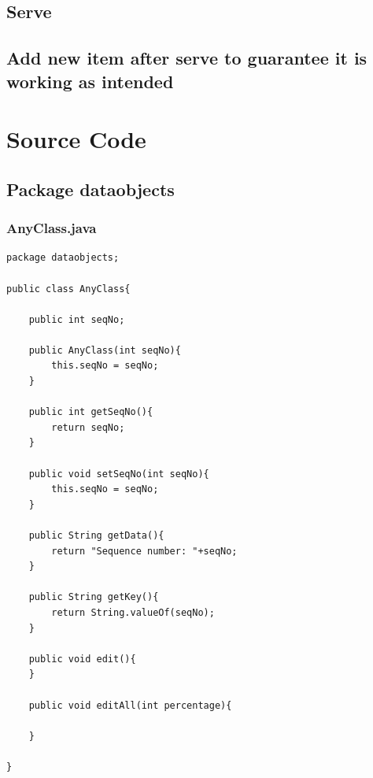 \documentclass[12pt]{article}
\begin{document}
\subsection{Serve}
\subsection{Add new item after serve to guarantee it is working as intended}
\bigskip
\newpage
\section{Source Code}
\bigskip

\footnotesize
\subsection{Package dataobjects}
\subsubsection{AnyClass.java}
\begin{lstlisting}
package dataobjects;

public class AnyClass{

    public int seqNo;

    public AnyClass(int seqNo){
        this.seqNo = seqNo;
    }

    public int getSeqNo(){
        return seqNo;
    }

    public void setSeqNo(int seqNo){
        this.seqNo = seqNo;
    }

    public String getData(){
        return "Sequence number: "+seqNo;
    }

    public String getKey(){
        return String.valueOf(seqNo);
    }

    public void edit(){
    }

    public void editAll(int percentage){

    }

}
\end{lstlisting}
\end{document}
